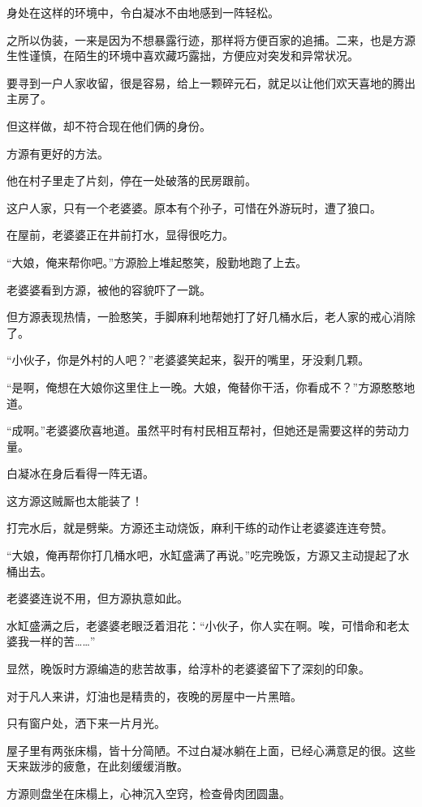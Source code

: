 \begin{this_body}
身处在这样的环境中，令白凝冰不由地感到一阵轻松。

之所以伪装，一来是因为不想暴露行迹，那样将方便百家的追捕。二来，也是方源生性谨慎，在陌生的环境中喜欢藏巧露拙，方便应对突发和异常状况。

要寻到一户人家收留，很是容易，给上一颗碎元石，就足以让他们欢天喜地的腾出主房了。

但这样做，却不符合现在他们俩的身份。

方源有更好的方法。

他在村子里走了片刻，停在一处破落的民房跟前。

这户人家，只有一个老婆婆。原本有个孙子，可惜在外游玩时，遭了狼口。

在屋前，老婆婆正在井前打水，显得很吃力。

“大娘，俺来帮你吧。”方源脸上堆起憨笑，殷勤地跑了上去。

老婆婆看到方源，被他的容貌吓了一跳。

但方源表现热情，一脸憨笑，手脚麻利地帮她打了好几桶水后，老人家的戒心消除了。

“小伙子，你是外村的人吧？”老婆婆笑起来，裂开的嘴里，牙没剩几颗。

“是啊，俺想在大娘你这里住上一晚。大娘，俺替你干活，你看成不？”方源憨憨地道。

“成啊。”老婆婆欣喜地道。虽然平时有村民相互帮衬，但她还是需要这样的劳动力量。

白凝冰在身后看得一阵无语。

这方源这贼厮也太能装了！

打完水后，就是劈柴。方源还主动烧饭，麻利干练的动作让老婆婆连连夸赞。

“大娘，俺再帮你打几桶水吧，水缸盛满了再说。”吃完晚饭，方源又主动提起了水桶出去。

老婆婆连说不用，但方源执意如此。

水缸盛满之后，老婆婆老眼泛着泪花：“小伙子，你人实在啊。唉，可惜命和老太婆我一样的苦……”

显然，晚饭时方源编造的悲苦故事，给淳朴的老婆婆留下了深刻的印象。

对于凡人来讲，灯油也是精贵的，夜晚的房屋中一片黑暗。

只有窗户处，洒下来一片月光。

屋子里有两张床榻，皆十分简陋。不过白凝冰躺在上面，已经心满意足的很。这些天来跋涉的疲惫，在此刻缓缓消散。

方源则盘坐在床榻上，心神沉入空窍，检查骨肉团圆蛊。


\end{this_body}
